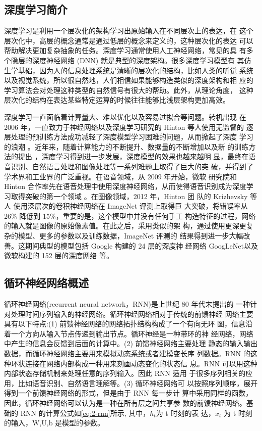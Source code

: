 \subsection{深度学习简介}
深度学习是利用一个层次化的架构学习出原始输入在不同层次上的表达，在 这个层次化中，高层的概念通常是通过低层的概念来定义的，这种层次化的表达 可以帮助解决更加复杂抽象的任务。深度学习通常使用人工神经网络，常见的具 有多个隐层的深度神经网络 (DNN) 就是典型的深度架构。很多深度学习模型有 其仿生学基础，因为人的信息处理系统是清晰的层次化的结构，比如人类的听觉 系统以及视觉系统，所以很自然地，人们相信如果能够构造类似的深度架构和相 应的学习算法会对处理这种类型的自然信号有很大的帮助。此外，从理论角度， 这种层次化的结构在表达某些特定运算的时候往往能够比浅层架构更加高效。

深度学习一直面临着计算量大、难以优化以及容易过拟合等问题。转机出现 在 2006 年，一直致力于神经网络以及深度学习研究的 Hinton 等人使用无监督的 逐层处理的预训练方法成功减轻了深度模型学习困难的问题，从而掀起了深度 学习的浪潮 \citep{Sch2006Efficient}。近年来，随着计算能力的不断提升、数据量的不断增加以及新 的训练方法的提出 \citep{Srivastava2014Dropout}，深度学习得到进一步发展，深度模型的效果也越来越明 显，最终在语音识别、自然语言处理和图像处理等一系列难题上取得了巨大的突 破，并得到了学术界和工业界的广泛重视。在语音领域，从 2009 年开始，微软 研究院和 Hinton 合作率先在语音处理中使用深度神经网络，从而使得语音识别成为深度学习取得突破的第一个领域 \citep{Hinton2012Deep,Deng2013New}。在图像领域，2012 年，Hinton 团 队的 Krizhevsky 等人 \citep{Krizhevsky2012ImageNet}  使用深层次的卷积神经网络在 ImageNet 评测上取得巨 大突破，将错误率从 26\% 降低到 15\%，重要的是，这个模型中并没有任何手工 构造特征的过程，网络的输入就是图像的原始像素值。在此之后，采用类似的架 构，通过使用更深更复杂的模型、更多的参数以及训练数据，ImageNet 评测的 结果得到进一步大幅改善。这期间典型的模型包括 Google 构建的 24 层的深度神 经网络 GoogLeNet\citep{Szegedy2015Going}以及微软构建的 152 层的深度网络  \citep{He2016Deep,He2016Identity} 等。

\subsection{循环神经网络概述}

循环神经网络(recurrent neural network，RNN)是上世纪 80 年代末提出的 一种针对处理时间序列输入的神经网络。循环神经网络相对于传统的前馈神经 网络主要具有以下特点:(1) 前馈神经网络的网络拓扑结构构成了一个有向无环 图，信息沿着一个方向从输入节点传递到输出节点。循环神经是一种带环的神 经网络，网络中产生的信息会反馈到后面的计算中。(2) 前馈神经网络主要处理 静态的输入输出数据，而循环神经网络主要用来模拟动态系统或者建模变长序 列数据。RNN 的这种环状连接在网络内部构成一种用来刻画动态变化的状态信 息。RNN 可以用这种内部状态存储机制来处理任意的序列输入。因此 RNN 适用 于很多序列相关的应用，比如语音识别、自然语言理解等。(3) 循环神经网络可 以按照序列顺序，展开得到一个前馈神经网络的形式，但是由于 RNN 每一步计 算中采用同样的函数，因此，循环神经网络可以认为是一种在所有层之间共享参 数的前馈神经网络。基础的 RNN 的计算公式如\ref{eq:2-rnn}所示, 其中，$h_t$为 t 时刻的表 达，$x_t$ 为 t 时刻的输入，W,U,b 是模型的参数。

